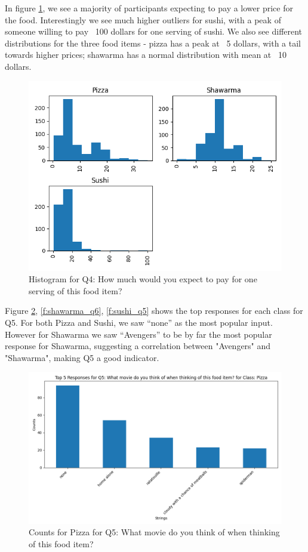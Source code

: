 
In figure \ref{f:hist_q4}, we see a majority of participants expecting to pay a lower price for the food. 
Interestingly we see much higher outliers for sushi, with a peak of someone willing to pay ~100 dollars 
for one serving of sushi. We also see different distributions for the three food items - pizza has a peak at 
~5 dollars, with a tail towards higher prices; shawarma has a normal distribution with mean at ~10 dollars.
\begin{figure}[h]
    \centerline{\includegraphics[width=\columnwidth]{data/histogram_Q4.png}}
    \caption{Histogram for Q4: How much would you expect to pay for one serving of this food item?}
    \label{f:hist_q4}
\end{figure}

Figure \ref{f:pizza_q5}, \ref{f:shawarma_q6}, \ref{f:sushi_q5} shows the top responses for each class for Q5.
For both Pizza and Sushi, we saw “none” as the most popular input. However for Shawarma we saw “Avengers” to be by far the most popular response for Shawarma, suggesting a 
correlation between "Avengers" and "Shawarma", making Q5 a good indicator.

\begin{figure}[ht]
    \centerline{\includegraphics[width=\columnwidth]{data/top_5_responses_Q5_Pizza.png}}
    \caption{Counts for Pizza for Q5: What movie do you think of when thinking of this food item?}
    \label{f:pizza_q5}
\end{figure}

